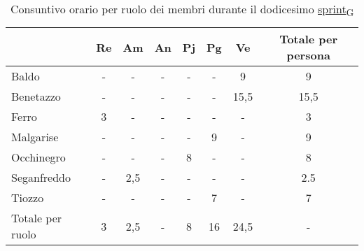 \begin{table}[!h]
    \centering
    \begin{tabular}{ | l | c | c | c | c | c | c | c | }
        \hline
        \textbf{} & \textbf{Re} & \textbf{Am} &\textbf{An} & \textbf{Pj} & \textbf{Pg} & \textbf{Ve} & \textbf{Totale per persona} \\
        \hline
        Baldo            &  -   &  -   &  -   &  -   &  -   &  9   &  9   \\
        Benetazzo        &  -   &  -   &  -   &  -   &  -   & 15,5 & 15,5 \\
        Ferro            &  3   &  -   &  -   &  -   &  -   &  -   &  3   \\
        Malgarise        &  -   &  -   &  -   &  -   &  9   &  -   &  9   \\
        Occhinegro       &  -   &  -   &  -   &  8   &  -   &  -   &  8   \\
        Seganfreddo      &  -   &  2,5 &  -   &  -   &  -   &  -   &  2.5 \\
        Tiozzo           &  -   &  -   &  -   &  -   &  7   &  -   &  7   \\
        \hline
        Totale per ruolo &  3   &  2,5 &  -   &  8   & 16   & 24,5 &  -   \\
        \hline
    \end{tabular}
    \caption{Consuntivo orario per ruolo dei membri durante il dodicesimo \href{https://7last.github.io/docs/pb/documentazione-interna/glossario\#sprint}{sprint\textsubscript{G}}}
\end{table}


